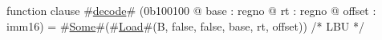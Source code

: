 function clause #\hyperref[zdecode]{decode}# (0b100100 @ base : regno @ rt : regno @ offset : imm16) =
  #\hyperref[zSome]{Some}#(#\hyperref[zLoad]{Load}#(B, false, false, base, rt, offset)) /* LBU */
